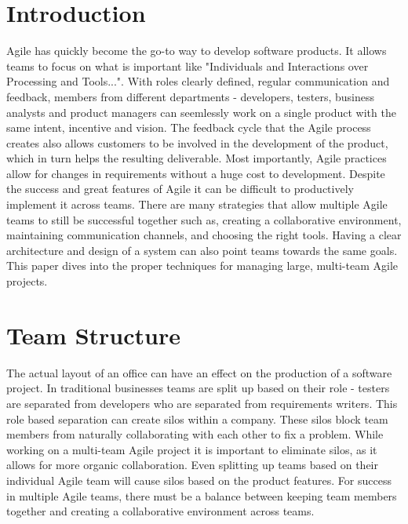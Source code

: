 \documentclass[sigplan,screen]{acmart}
\begin{document}
\section{Introduction}
Agile has quickly become the go-to way to develop software products.
It allows teams to focus on what is important like "Individuals and Interactions over Processing and Tools..."\cite{b1}. 
With roles clearly defined, regular communication and feedback, members from different departments - developers, testers, business analysts and product managers can seemlessly work on a single product with the same intent, incentive and vision.
The feedback cycle that the Agile process creates also allows customers to be involved in the development of the product, which in turn helps the resulting deliverable.
Most importantly, Agile practices allow for changes in requirements without a huge cost to development.
Despite the success and great features of Agile it can be difficult to productively implement it across teams.
There are many strategies that allow multiple Agile teams to still be successful together such as, creating a collaborative environment, maintaining communication channels, and choosing the right tools.
Having a clear architecture and design of a system can also point teams towards the same goals.
This paper dives into the proper techniques for managing large, multi-team Agile projects.

 
\section{Team Structure}
The actual layout of an office can have an effect on the production of a software project.
In traditional businesses teams are split up based on their role - testers are separated from developers who are separated from requirements writers.
This role based separation can create silos within a company. 
These silos block team members from naturally collaborating with each other to fix a problem.
While working on a multi-team Agile project it is important to eliminate silos, as it allows for more organic collaboration\cite{b2}.
Even splitting up teams based on their individual Agile team will cause silos based on the product features.
For success in multiple Agile teams, there must be a balance between keeping team members together and creating a collaborative environment across teams.
\end{document}
